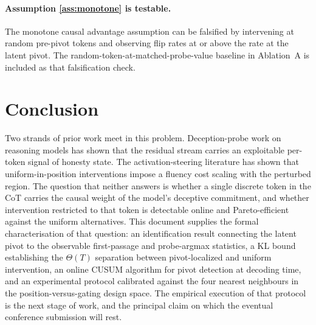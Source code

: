 \documentclass[11pt]{article}
\theoremstyle{definition}
\newcommand{\1}{\mathbf{1}}
\begin{document}
\paragraph{Assumption \ref{ass:monotone} is testable.} The monotone causal advantage assumption can be falsified by intervening at random pre-pivot tokens and observing flip rates at or above the rate at the latent pivot. The random-token-at-matched-probe-value baseline in Ablation~A is included as that falsification check.

\section{Conclusion}
\label{sec:conclusion}

Two strands of prior work meet in this problem. Deception-probe work on reasoning models has shown that the residual stream carries an exploitable per-token signal of honesty state. The activation-steering literature has shown that uniform-in-position interventions impose a fluency cost scaling with the perturbed region. The question that neither answers is whether a single discrete token in the CoT carries the causal weight of the model's deceptive commitment, and whether intervention restricted to that token is detectable online and Pareto-efficient against the uniform alternatives. This document supplies the formal characterisation of that question: an identification result connecting the latent pivot to the observable first-passage and probe-argmax statistics, a KL bound establishing the $\Theta(T)$ separation between pivot-localized and uniform intervention, an online CUSUM algorithm for pivot detection at decoding time, and an experimental protocol calibrated against the four nearest neighbours in the position-versus-gating design space. The empirical execution of that protocol is the next stage of work, and the principal claim on which the eventual conference submission will rest.
\end{document}
